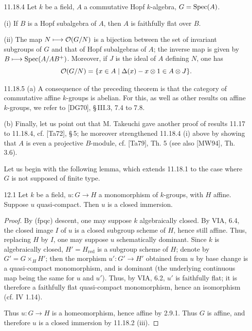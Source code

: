 \begin{corollary}{11.18.4}\label{VIB.11.18.4}
Let $k$ be a field, $A$ a commutative Hopf $k$-algebra, $G=\operatorname{Spec}(A)$.

(i) If $B$ is a Hopf subalgebra of $A$, then $A$ is faithfully flat over $B$.

(ii) The map $N\longmapsto\mathcal{O}(G/N)$ is a bijection between the set of invariant subgroups of $G$ and that of Hopf subalgebras of $A$; the inverse map is given by $B\longmapsto\operatorname{Spec}(A/AB^+)$. Moreover, if $J$ is the ideal of $A$ defining $N$, one has
\[
\mathcal{O}(G/N)=\{x\in A\mid\Delta(x)-x\otimes1\in A\otimes J\}.
\]
\end{corollary}

\begin{remarks}{11.18.5}\label{VIB.11.18.5}
(a) A consequence of the preceding theorem is that the category of commutative affine $k$-groups is abelian. For this, as well as other results on affine $k$-groups, we refer to [DG70], \S\,III.3, 7.4 to 7.8.

(b) Finally, let us point out that M. Takeuchi gave another proof of results 11.17 to 11.18.4, cf. [Ta72], \S\,5; he moreover strengthened 11.18.4 (i) above by showing that $A$ is even a projective $B$-module, cf. [Ta79], Th. 5 (see also [MW94], Th. 3.6).
\end{remarks}

 Let us begin with the following lemma, which extends 11.18.1 to the case where $G$ is not supposed of finite type.

\begin{lemma}{12.1}\label{VIB.12.1}
Let $k$ be a field, $u:G\to H$ a monomorphism of $k$-groups, with $H$ affine. Suppose $u$ quasi-compact. Then $u$ is a closed immersion.
\end{lemma}
\begin{proof}
By (fpqc) descent, one may suppose $k$ algebraically closed. By VIA, 6.4, the closed image $I$ of $u$ is a closed subgroup scheme of $H$, hence still affine. Thus, replacing $H$ by $I$, one may suppose $u$ schematically dominant. Since $k$ is algebraically closed, $H'=H_{\mathrm{red}}$ is a subgroup scheme of $H$; denote by $G'=G\times_H H'$; then the morphism $u':G'\to H'$ obtained from $u$ by base change is a quasi-compact monomorphism, and is dominant (the underlying continuous map being the same for $u$ and $u'$). Thus, by VIA, 6.2, $u'$ is faithfully flat; it is therefore a faithfully flat quasi-compact monomorphism, hence an isomorphism (cf. IV 1.14).

Thus $u:G\to H$ is a homeomorphism, hence affine by 2.9.1. Thus $G$ is affine, and therefore $u$ is a closed immersion by 11.18.2 (iii).
\end{proof}

